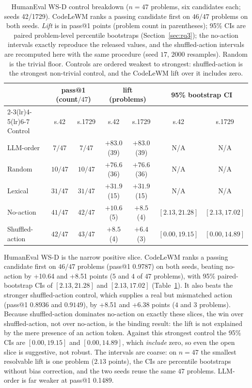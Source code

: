\documentclass[11pt]{article}
\newcommand{\modelname}{CodeLeWM}
\begin{document}
\begin{table}[t]
\centering
\caption{HumanEval WS-D control breakdown ($n=47$ problems, six candidates each;
seeds 42/1729). \modelname{} ranks a passing candidate first on $46/47$ problems
on both seeds. \emph{Lift} is in pass@1 points (problem count in parentheses);
95\% CIs are paired problem-level percentile bootstraps (Section~\ref{sec:rq3});
the no-action intervals exactly reproduce the released values, and the
shuffled-action intervals are recomputed here with the same procedure (seed $17$,
$2000$ resamples). Random is the trivial floor. Controls are ordered weakest to
strongest: shuffled-action is the strongest non-trivial control, and the
\modelname{} lift over it includes zero.}
\label{tab:control}
\small
\begin{tabular}{lcccccc}
\toprule
& \multicolumn{2}{c}{pass@1 (count$/47$)} & \multicolumn{2}{c}{lift (problems)} & \multicolumn{2}{c}{95\% bootstrap CI} \\
\cmidrule(lr){2-3}\cmidrule(lr){4-5}\cmidrule(lr){6-7}
Control & s.42 & s.1729 & s.42 & s.1729 & s.42 & s.1729 \\
\midrule
LLM-order       & $7/47$  & $7/47$  & $+83.0$ (39) & $+83.0$ (39) & N/A            & N/A            \\
Random          & $10/47$ & $10/47$ & $+76.6$ (36) & $+76.6$ (36) & N/A            & N/A            \\
Lexical         & $31/47$ & $31/47$ & $+31.9$ (15) & $+31.9$ (15) & N/A            & N/A            \\
No-action       & $41/47$ & $42/47$ & $+10.6$ (5)  & $+8.5$ (4)   & $[2.13,21.28]$ & $[2.13,17.02]$ \\
Shuffled-action & $42/47$ & $43/47$ & $+8.5$ (4)   & $+6.4$ (3)   & $[0.00,19.15]$ & $[0.00,14.89]$ \\
\bottomrule
\end{tabular}
\end{table}

HumanEval WS-D is the narrow positive slice. \modelname{} ranks a passing
candidate first on $46/47$ problems (pass@1 0.9787) on both seeds, beating
no-action by +10.64 and +8.51 points ($5$ and $4$ of $47$ problems), with 95\%
paired-bootstrap CIs of $[2.13, 21.28]$ and $[2.13, 17.02]$
(Table~\ref{tab:control}). It also beats the stronger shuffled-action control,
which supplies a real but mismatched action (pass@1 $0.8936$ and $0.9149$), by
+8.51 and +6.38 points ($4$ and $3$ problems). Because shuffled-action dominates
no-action on exactly these slices, the win over shuffled-action, not over
no-action, is the binding result: the lift is not explained by the mere presence
of an action token. Against this strongest control the 95\% CIs are
$[0.00, 19.15]$ and $[0.00, 14.89]$, which \emph{include} zero, so even the open
slice is suggestive, not robust. The intervals are coarse: on $n=47$ the smallest
resolvable lift is one problem ($2.13$ points), the CIs are percentile bootstraps
without bias correction, and the two seeds reuse the same $47$ problems.
LLM-order is far weaker at pass@1 0.1489.
\end{document}
